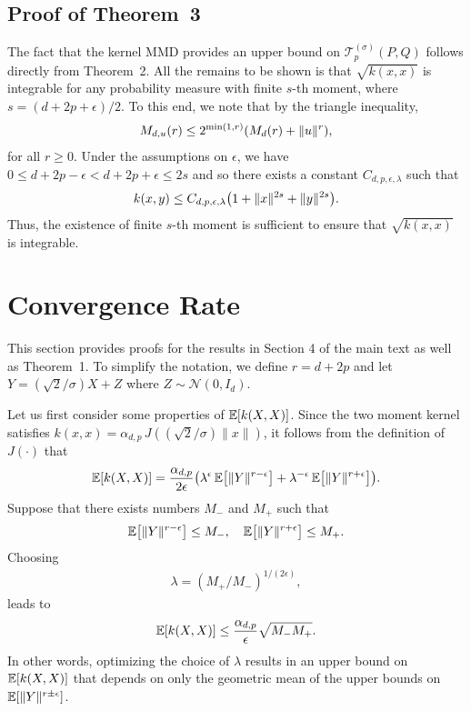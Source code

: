 \documentclass{article}
\theoremstyle{definition}
\newcommand{\ex}[1]{\ensuremath{\mathbb{E}\left[ #1\right]}}
\newcommand{\normal}{\mathcal{N}}
\newcommand{\cT}{\mathcal{T}}
\newcommand{\eps}{\epsilon}
\let\originalleft\left
\let\originalright\right
\renewcommand{\left}{\mathopen{}\mathclose\bgroup\originalleft}
\renewcommand{\right}{\aftergroup\egroup\originalright}
\begin{document}
\subsection{Proof of Theorem~3}
The fact that the kernel MMD provides an upper bound on $\cT_p^{(\sigma)}(P,Q)$ follows directly from Theorem~2. All the remains to be shown is that $\sqrt{k(x,x)}$ is integrable for any probability measure with finite $s$-th moment, where $s = (d + 2p + \eps)/2$. To this end, we note that by the triangle inequality, 
\begin{align*}
    M_{d,u}(r) \le  2^{\min(1,r)}  \left( M_{d}(r)   + \|u\|^r \right),
\end{align*}
for all $r \ge 0$. Under the assumptions on $\eps$, we have $0 \le d + 2p - \eps < d + 2p + \eps \le 2s$ and so there exists a constant $C_{d,p,\eps,\lambda}$ such that 
\begin{align*}
k(x,y) \le C_{d,p,\eps,\lambda} \left(1 + \|x\|^{2s} + \|y\|^{2s}  \right) .
\end{align*}
Thus, the existence of finite $s$-th moment is sufficient to ensure that $\sqrt{k(x,x)}$ is integrable. 

\section{Convergence Rate} 

This section provides proofs for the results in Section 4 of the main text as well as Theorem~1.  To simplify the notation, we define  $r = d + 2p$ and let $Y = (\sqrt{2}/\sigma) X + Z$ where $Z  \sim \normal(0, I_d)$.  


Let us first consider some properties of $\ex{k(X,X)}$. Since the two moment kernel satisfies $k(x,x) = \alpha_{d,p} \, J( ( \sqrt{2} / \sigma ) \|x\| )$, it follows from the definition of $J(\cdot)$ that
\begin{align}
\ex{ k(X,X) } = \frac{ \alpha_{d,p}  }{ 2 \eps} \left( \lambda^\eps\, \ex{ \| Y\|^{r -\eps}}  + \lambda^{-\eps} \,\ex{ \|Y\|^{r + \eps}}   \right) . \label{eq:kxx_exact}
\end{align}
Suppose that there exists numbers $M_-$ and $M_+$ such that
\begin{align}
\ex{ \|Y\|^{r - \eps} } \le M_-  , \quad \ex{ \|Y\|^{r  + \eps} } \le M_+. \label{seq:Yr_bnd}
\end{align}
Choosing 
\begin{align}
\lambda = ( M_+/M_-)^{1/(2 \eps)}, \label{sec:lambda_opt}
\end{align}
leads to 
\begin{align}
\ex{ k(X,X) } \le  \frac{ \alpha_{d,p}  }{ \eps}  \sqrt{M_- M_{+}}. \label{seq:kxx_UB}
\end{align}
In other words, optimizing the choice of $\lambda$  results in an upper bound  on $\ex{k(X,X)}$ that depends on only the geometric mean  of the upper bounds on  $ \ex{ \|Y\|^{r \pm \eps}} $. 
\end{document}
